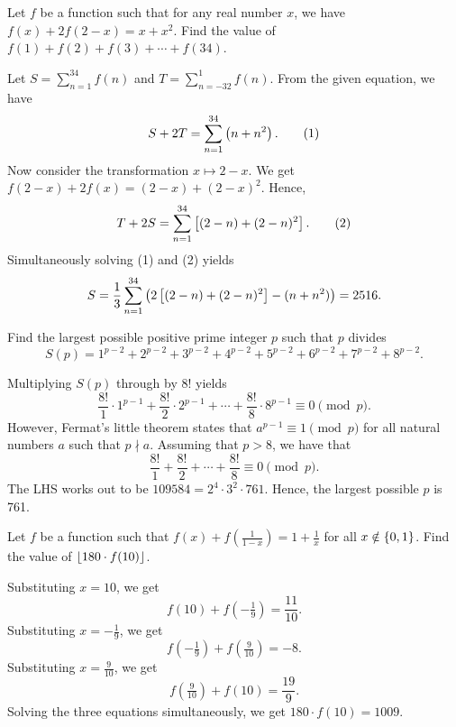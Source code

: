 \begin{question}[2516]\label{Q::2024-O-1-18}
    Let $f$ be a function such that for any real number $x$, we have $f(x) + 2f(2-x) = x + x^2$. Find the value of $f(1) + f(2) + f(3) + \cdots + f(34)$.
\end{question}
\begin{solution*}
    Let $S = \sum_{n=1}^{34} f(n)$ and $T = \sum_{n=-32}^1 f(n)$. From the given equation, we have \[S + 2T = \sum_{n=1}^{34} \left( n + n^2 \right). \tag{1}\] Now consider the transformation $x \mapsto 2-x$. We get $f(2-x) + 2f(x) = (2-x) + (2-x)^2$. Hence, \[T + 2S = \sum_{n=1}^{34} \left[ (2-n) + (2-n)^2 \right]. \tag{2}\] Simultaneously solving (1) and (2) yields \[S = \frac13 \sum_{n=1}^{34} \left( 2\left[ (2-n) + (2-n)^2 \right] - (n + n^2) \right) = 2516.\]
\end{solution*}

\begin{question}[761]\label{Q::2024-O-1-19}
    Find the largest possible positive prime integer $p$ such that $p$ divides \[S(p) = 1^{p-2} + 2^{p-2} + 3^{p-2} + 4^{p-2} + 5^{p-2} + 6^{p-2} + 7^{p-2} + 8^{p-2}.\]
\end{question}
\begin{solution*}
    Multiplying $S(p)$ through by $8!$ yields \[\frac{8!}{1} \cdot 1^{p-1} + \frac{8!}{2} \cdot 2^{p-1} + \cdots + \frac{8!}{8} \cdot 8^{p-1}\equiv 0 \pmod{p}.\] However, Fermat's little theorem states that $a^{p-1} \equiv 1 \pmod{p}$ for all natural numbers $a$ such that $p \nmid a$. Assuming that $p > 8$, we have that \[\frac{8!}{1} + \frac{8!}{2} + \cdots + \frac{8!}{8} \equiv 0 \pmod{p}.\] The LHS works out to be $109584 = 2^4 \cdot 3^2 \cdot 761$. Hence, the largest possible $p$ is 761.
\end{solution*}

\begin{question}[1009]\label{Q::2024-O-1-20}
    Let $f$ be a function such that $f(x) + f(\frac{1}{1-x}) = 1 + \frac1x$ for all $x \notin \left\lbrace 0, 1 \right\rbrace$. Find the value of $\left\lfloor 180 \cdot f(10) \right\rfloor$.
\end{question}
\begin{solution*}
    Substituting $x = 10$, we get \[f(10) + f(-\tfrac19) = \frac{11}{10}.\] Substituting $x = -\frac19$, we get \[f(-\tfrac19) + f(\tfrac9{10}) = -8.\] Substituting $x = \frac9{10}$, we get \[f(\tfrac9{10}) + f(10) = \frac{19}9.\] Solving the three equations simultaneously, we get $180 \cdot f(10) = 1009$.
\end{solution*}

